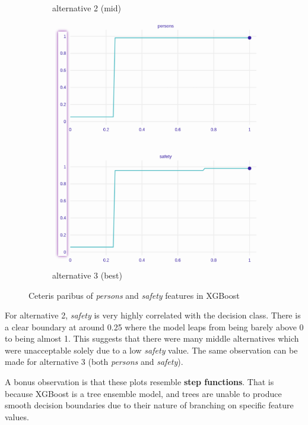 \documentclass[../main.tex]{subfiles}
\begin{document}
\begin{figure}[H]
\begin{subfigure}[b]{0.32\linewidth}
		\caption{alternative 2 (mid)}
		\label{fig:xgb-3alt1-cetpar}
	\end{subfigure}
	\begin{subfigure}[b]{0.32\linewidth}
		\includegraphics[width=\linewidth]{../img/xgb-cetpar-best.png}
		\caption{alternative 3 (best)}
		\label{fig:xgb-3alt1-cetpar}
	\end{subfigure}
	\caption{Ceteris paribus of \emph{persons} and \emph{safety} features in XGBoost}
	\label{fig:xgb-3alt-allcetpar}
\end{figure}
For alternative 2, \emph{safety} is very highly correlated with the decision
class. There is a clear boundary at around 0.25 where the model leaps from
being barely above 0 to being almost 1. This suggests that there were many
middle alternatives which were unacceptable solely due to a low \emph{safety}
value. The same observation can be made for alternative 3 (both
\emph{persons} and \emph{safety}).

A bonus observation is that these plots resemble \textbf{step functions}. That
is because XGBoost is a tree ensemble model, and trees are unable to produce
smooth decision boundaries due to their nature of branching on specific feature
values.
\end{document}
